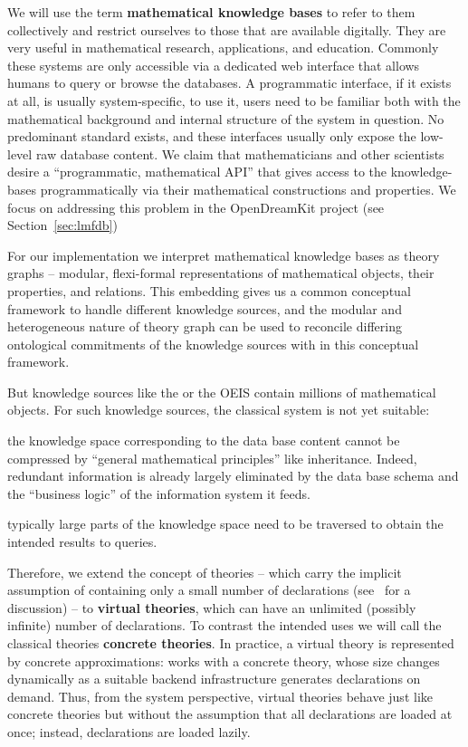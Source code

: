 We will use the term \textbf{mathematical knowledge bases} to refer to them collectively and restrict ourselves to those that are available digitally.
They are very useful in mathematical research, applications, and education.  
Commonly these systems are only accessible via a dedicated web interface that allows humans to query or browse the databases. 
A programmatic interface, if it exists at all, is usually system-specific, to use it, users need to be familiar both with the mathematical background and internal structure of the system in question.  
No predominant standard exists, and these interfaces usually only expose the low-level raw database content.
We claim that mathematicians and other scientists desire a ``programmatic, mathematical API'' that gives access to the knowledge-bases programmatically via their mathematical constructions and properties. 
We focus on addressing this problem in the OpenDreamKit project (see Section~\ref{sec:lmfdb})

For our implementation we interpret mathematical knowledge bases as \ommt theory graphs -- modular, flexi-formal representations of mathematical objects, their properties, and relations. 
This embedding gives us a common conceptual framework to handle different knowledge sources, and the modular and heterogeneous nature of \ommt theory graph can be used to reconcile differing ontological commitments of the knowledge sources with in this conceptual framework.


But knowledge sources like the \lmfdb or the OEIS contain millions of mathematical objects. For such knowledge sources, the classical \mmt system is not yet suitable:
\begin{compactitem}
\item the knowledge space corresponding to the data base content cannot be compressed by ``general mathematical principles'' like inheritance. 
Indeed, redundant information is already largely eliminated by the data base schema and the ``business logic'' of the information system it feeds.
\item typically large parts of the knowledge space need to be traversed to obtain the intended results to queries.
\end{compactitem}
Therefore, we extend the concept of \ommt theories -- which carry the implicit assumption of containing only a small number of declarations (see~\cite{FaGu:lt92} for a discussion) -- to \textbf{virtual theories}, which can have an unlimited (possibly infinite) number of declarations. 
To contrast the intended uses we will call the classical \ommt theories \textbf{concrete theories}.  
In practice, a virtual theory is represented by concrete approximations: \ommt works with
a concrete theory, whose size changes dynamically as a suitable backend infrastructure
generates declarations on demand.
Thus, from the system perspective, virtual theories behave just like concrete theories but without the assumption that all declarations are loaded at once; instead, declarations  are loaded lazily.

